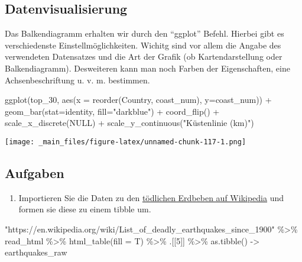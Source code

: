 \documentclass[11pt,german,a4paper]{article}
\newenvironment{Shaded}{\begin{snugshade}}{\end{snugshade}}
\newcommand{\AttributeTok}[1]{\textcolor[rgb]{0.77,0.63,0.00}{#1}}
\newcommand{\ConstantTok}[1]{\textcolor[rgb]{0.00,0.00,0.00}{#1}}
\newcommand{\DecValTok}[1]{\textcolor[rgb]{0.00,0.00,0.81}{#1}}
\newcommand{\FunctionTok}[1]{\textcolor[rgb]{0.00,0.00,0.00}{#1}}
\newcommand{\NormalTok}[1]{#1}
\newcommand{\OtherTok}[1]{\textcolor[rgb]{0.56,0.35,0.01}{#1}}
\newcommand{\SpecialCharTok}[1]{\textcolor[rgb]{0.00,0.00,0.00}{#1}}
\newcommand{\StringTok}[1]{\textcolor[rgb]{0.31,0.60,0.02}{#1}}
\providecommand{\tightlist}{%
  \setlength{\itemsep}{0pt}\setlength{\parskip}{0pt}}
\begin{document}
\hypertarget{datenvisualisierung}{%
\subsection{Datenvisualisierung}\label{datenvisualisierung}}

Das Balkendiagramm erhalten wir durch den ``ggplot'' Befehl. Hierbei gibt es verschiedenste Einstellmöglichkeiten. Wichitg sind vor allem die Angabe des verwendeten Datensatzes und die Art der Grafik (ob Kartendarstellung oder Balkendiagramm). Desweiteren kann man noch Farben der Eigenschaften, eine Achsenbeschriftung u. v. m. bestimmen.

\begin{Shaded}
\begin{Highlighting}[]
\FunctionTok{ggplot}\NormalTok{(top\_30, }\FunctionTok{aes}\NormalTok{(}\AttributeTok{x =} \FunctionTok{reorder}\NormalTok{(Country, coast\_num), }\AttributeTok{y=}\NormalTok{coast\_num)) }\SpecialCharTok{+}
  \FunctionTok{geom\_bar}\NormalTok{(}\AttributeTok{stat=}\StringTok{\textquotesingle{}identity\textquotesingle{}}\NormalTok{, }\AttributeTok{fill=}\StringTok{"darkblue"}\NormalTok{) }\SpecialCharTok{+}
  \FunctionTok{coord\_flip}\NormalTok{() }\SpecialCharTok{+}
  \FunctionTok{scale\_x\_discrete}\NormalTok{(}\ConstantTok{NULL}\NormalTok{) }\SpecialCharTok{+}
  \FunctionTok{scale\_y\_continuous}\NormalTok{(}\StringTok{"Küstenlinie (km)"}\NormalTok{)}
\end{Highlighting}
\end{Shaded}

\texttt{[image: \_main\_files/figure-latex/unnamed-chunk-117-1.png]}

\hypertarget{aufgaben-5}{%
\subsection{Aufgaben}\label{aufgaben-5}}

\begin{enumerate}
\def\labelenumi{\arabic{enumi}.}
\tightlist
\item
  Importieren Sie die Daten zu den \href{https://en.wikipedia.org/wiki/List_of_deadly_earthquakes_since_1900}{tödlichen Erdbeben auf Wikipedia}
  und formen sie diese zu einem tibble um.
\end{enumerate}

\begin{Shaded}
\begin{Highlighting}[]
\StringTok{"https://en.wikipedia.org/wiki/List\_of\_deadly\_earthquakes\_since\_1900"} \SpecialCharTok{\%\textgreater{}\%}
\NormalTok{  read\_html }\SpecialCharTok{\%\textgreater{}\%}
  \FunctionTok{html\_table}\NormalTok{(}\AttributeTok{fill =}\NormalTok{ T) }\SpecialCharTok{\%\textgreater{}\%}
\NormalTok{  .[[}\DecValTok{5}\NormalTok{]] }\SpecialCharTok{\%\textgreater{}\%}
  \FunctionTok{as.tibble}\NormalTok{() }\OtherTok{{-}\textgreater{}}\NormalTok{ earthquakes\_raw}
\end{Highlighting}
\end{Shaded}
\end{document}
